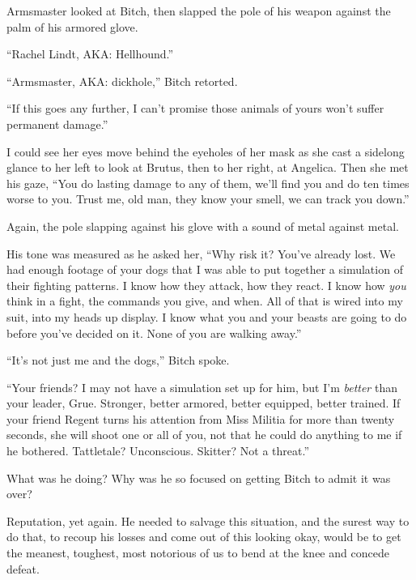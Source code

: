 Armsmaster looked at Bitch, then slapped the pole of his weapon against the palm of his armored glove.



``Rachel Lindt, AKA: Hellhound.''



``Armsmaster, AKA: dickhole,'' Bitch retorted.



``If this goes any further, I can't promise those animals of yours won't suffer permanent damage.''



I could see her eyes move behind the eyeholes of her mask as she cast a sidelong glance to her left to look at Brutus, then to her right, at Angelica.  Then she met his gaze, ``You do lasting damage to any of them, we'll find you and do ten times worse to you.  Trust me, old man, they know your smell, we can track you down.''



Again, the pole slapping against his glove with a sound of metal against metal.



His tone was measured as he asked her, ``Why risk it?  You've already lost.  We had enough footage of your dogs that I was able to put together a simulation of their fighting patterns.  I know how they attack, how they react.  I know how \emph{you} think in a fight, the commands you give, and when.  All of that is wired into my suit, into my heads up display.  I know what you and your beasts are going to do before you've decided on it.  None of you are walking away.''



``It's not just me and the dogs,'' Bitch spoke.



``Your friends?  I may not have a simulation set up for him, but I'm \emph{better} than your leader, Grue.  Stronger, better armored, better equipped, better trained.  If your friend Regent turns his attention from Miss Militia for more than twenty seconds, she will shoot one or all of you, not that he could do anything to me if he bothered.  Tattletale?  Unconscious.  Skitter?  Not a threat.''



What was he doing?  Why was he so focused on getting Bitch to admit it was over?



Reputation, yet again.  He needed to salvage this situation, and the surest way to do that, to recoup his losses and come out of this looking okay, would be to get the meanest, toughest, most notorious of us to bend at the knee and concede defeat.



